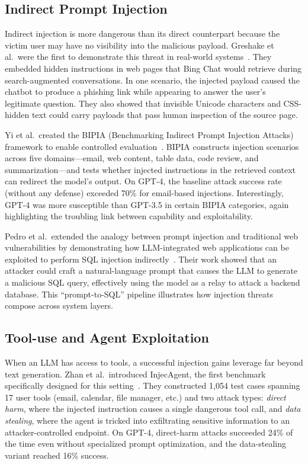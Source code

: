 \subsection{Indirect Prompt Injection}

Indirect injection is more dangerous than its direct counterpart because the victim user may have no visibility into the malicious payload. Greshake et al.\ were the first to demonstrate this threat in real-world systems~\cite{greshake2023indirect}. They embedded hidden instructions in web pages that Bing Chat would retrieve during search-augmented conversations. In one scenario, the injected payload caused the chatbot to produce a phishing link while appearing to answer the user's legitimate question. They also showed that invisible Unicode characters and CSS-hidden text could carry payloads that pass human inspection of the source page.

Yi et al.\ created the BIPIA (Benchmarking Indirect Prompt Injection Attacks) framework to enable controlled evaluation~\cite{yi2023bipia}. BIPIA constructs injection scenarios across five domains---email, web content, table data, code review, and summarization---and tests whether injected instructions in the retrieved context can redirect the model's output. On GPT-4, the baseline attack success rate (without any defense) exceeded 70\% for email-based injections. Interestingly, GPT-4 was more susceptible than GPT-3.5 in certain BIPIA categories, again highlighting the troubling link between capability and exploitability.

Pedro et al.\ extended the analogy between prompt injection and traditional web vulnerabilities by demonstrating how LLM-integrated web applications can be exploited to perform SQL injection indirectly~\cite{pedro2023prompt}. Their work showed that an attacker could craft a natural-language prompt that causes the LLM to generate a malicious SQL query, effectively using the model as a relay to attack a backend database. This ``prompt-to-SQL'' pipeline illustrates how injection threats compose across system layers.

\subsection{Tool-use and Agent Exploitation}

When an LLM has access to tools, a successful injection gains leverage far beyond text generation. Zhan et al.\ introduced InjecAgent, the first benchmark specifically designed for this setting~\cite{zhan2024injecagent}. They constructed 1{,}054 test cases spanning 17 user tools (email, calendar, file manager, etc.) and two attack types: \emph{direct harm}, where the injected instruction causes a single dangerous tool call, and \emph{data stealing}, where the agent is tricked into exfiltrating sensitive information to an attacker-controlled endpoint. On GPT-4, direct-harm attacks succeeded 24\% of the time even without specialized prompt optimization, and the data-stealing variant reached 16\% success.

